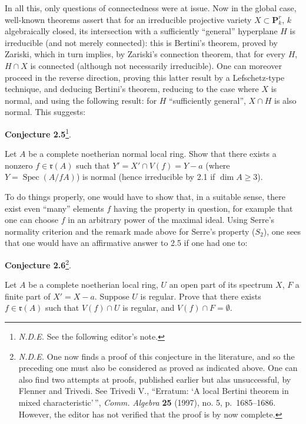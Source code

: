 \documentclass[
  11pt,
  a4paper,
]{book}
\begin{document}
In all this, only questions of connectedness were at issue. Now in the
global case, well-known theorems assert that for an irreducible
projective variety \(X \subset \mathbf{P}^{r}_{k}\), \(k\) algebraically
closed, its intersection with a sufficiently ``general'' hyperplane
\(H\) is irreducible (and not merely connected): this is Bertini's
theorem, proved by Zariski, which in turn implies, by Zariski's
connection theorem, that for every \(H\), \(H \cap X\) is connected
(although not necessarily irreducible). One can moreover proceed in the
reverse direction, proving this latter result by a Lefschetz-type
technique, and deducing Bertini's theorem, reducing to the case where
\(X\) is normal, and using the following result: for \(H\)
``sufficiently general'', \(X \cap H\) is also normal. This suggests:

\textbf{Conjecture 2.5}\footnote{\emph{N.D.E.} See the following
  editor's note.}.

Let \(A\) be a complete noetherian normal local ring. Show that there
exists a nonzero \(f \in \mathfrak{r}(A)\) such that
\(Y' = X' \cap V(f) = Y - {a}\) (where
\(Y = \operatorname{Spec}(A/fA)\)) is normal (hence irreducible by 2.1
if \(\dim A
\geqslant 3\)).

To do things properly, one would have to show that, in a suitable sense,
there exist even ``many'' elements \(f\) having the property in
question, for example that one can choose \(f\) in an arbitrary power of
the maximal ideal. Using Serre's normality criterion and the remark made
above for Serre's property (\(S_{2}\)), one sees that one would have an
affirmative answer to 2.5 if one had one to:

\textbf{Conjecture 2.6}\footnote{\emph{N.D.E.} One now finds a proof of
  this conjecture in the literature, and so the preceding one must also
  be considered as proved as indicated above. One can also find two
  attempts at proofs, published earlier but alas unsuccessful, by
  Flenner and Trivedi. See Trivedi V., ``Erratum: `A local Bertini
  theorem in mixed characteristic'\,'', \emph{Comm. Algebra} \textbf{25}
  (1997), no. 5, p.~1685--1686. However, the editor has not verified
  that the proof is by now complete.}.

Let \(A\) be a complete noetherian local ring, \(U\) an open part of its
spectrum \(X\), \(F\) a finite part of \(X' = X - {a}\). Suppose \(U\)
is regular. Prove that there exists \(f \in \mathfrak{r}(A)\) such that
\(V(f) \cap U\) is regular, and \(V(f)
\cap F = \emptyset\).
\end{document}

